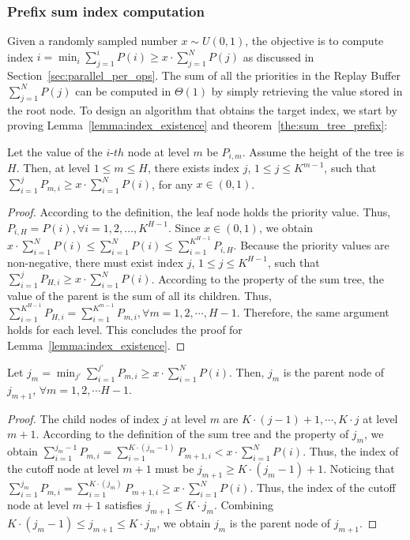 \subsubsection{Prefix sum index computation}
Given a randomly sampled number $x\sim U(0,1)$, the objective is to compute index $i=\min_{i}\sum_{j=1}^{i}P(i)\geq x\cdot \sum_{j=1}^{N}P(j)$ as discussed in Section~\ref{sec:parallel_per_ops}. The sum of all the priorities in the Replay Buffer $\sum_{j=1}^{N}P(j)$ can be computed in $\Theta(1)$ by simply retrieving the value stored in the root node. To design an algorithm that obtains the target index, we start by proving Lemma~\ref{lemma:index_existence} and theorem~\ref{the:sum_tree_prefix}:

\begin{lemma}
    \label{lemma:index_existence}
    Let the value of the $i$-$th$ node at level $m$ be $P_{i,m}$. Assume the height of the tree is $H$. Then, at level $1\leq m\leq H$, there exists index $j$, $1 \leq j \leq K^{m-1}$, such that $\sum_{i=1}^{j}P_{m, i}\geq x\cdot \sum_{i=1}^{N}P(i)$, for any $x\in (0, 1)$.
\end{lemma}
\begin{proof}
    According to the definition, the leaf node holds the priority value. Thus, $P_{i, H}=P(i), \forall i=1,2,\ldots, K^{H-1}$. Since $x\in (0, 1)$, we obtain $x\cdot \sum_{i=1}^{N}P(i)\leq \sum_{i=1}^{N}P(i) \leq \sum_{i=1}^{K^{H-1}}P_{i,H}$. Because the priority values are non-negative, there must exist index $j$, $1 \leq j \leq K^{H-1}$, such that $\sum_{i=1}^{j}P_{H, i}\geq x\cdot \sum_{i=1}^{N}P(i)$. According to the property of the sum tree, the value of the parent is the sum of all its children. Thus, $\sum_{i=1}^{K^{H-1}}P_{H, i}=\sum_{i=1}^{K^{m-1}}P_{m, i}, \forall m=1, 2, \cdots, H-1$. Therefore, the same argument holds for each level. This concludes the proof for Lemma~\ref{lemma:index_existence}.
\end{proof}
\begin{theorem}
    \label{the:sum_tree_prefix}
    Let $j_m=\min_{j'} \sum_{i=1}^{j'}P_{m, i}\geq x\cdot \sum_{i=1}^{N}P(i)$. Then, $j_m$ is the parent node of $j_{m+1}$, $\forall m=1,2,\cdots H-1$.
\end{theorem}
\begin{proof}
    The child nodes of index $j$ at level $m$ are $K\cdot(j-1)+1,\cdots, K\cdot j$ at level $m+1$. According to the definition of the sum tree and the property of $j_m$, we obtain $\sum_{i=1}^{j_m-1}P_{m,i}=\sum_{i=1}^{K\cdot(j_m-1)}P_{m+1, i}< x\cdot \sum_{i=1}^{N}P(i)$. Thus, the index of the cutoff node at level $m+1$ must be $j_{m+1}\geq K\cdot(j_m-1)+1$. Noticing that $\sum_{i=1}^{j_m}P_{m,i}=\sum_{i=1}^{K\cdot(j_m)}P_{m+1, i}\geq x\cdot \sum_{i=1}^{N}P(i)$. Thus, the index of the cutoff node at level $m+1$ satisfies $j_{m+1}\leq K\cdot j_m$. Combining $K\cdot(j_m-1)\leq j_{m+1}\leq K\cdot j_m$, we obtain $j_m$ is the parent node of $j_{m+1}$.
\end{proof}
